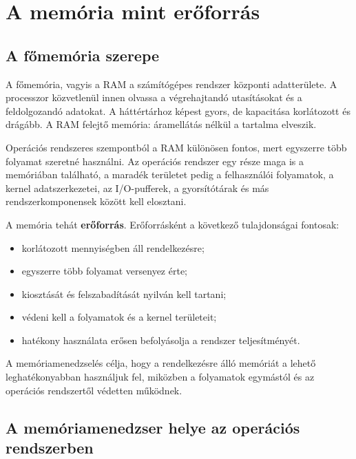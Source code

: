 \begin{center}

\end{center}

\section{A memória mint erőforrás}

\subsection{A főmemória szerepe}

A főmemória, vagyis a RAM a számítógépes rendszer központi adatterülete. A processzor közvetlenül innen olvassa a végrehajtandó utasításokat és a feldolgozandó adatokat. A háttértárhoz képest gyors, de kapacitása korlátozott és drágább. A RAM felejtő memória: áramellátás nélkül a tartalma elveszik.

Operációs rendszeres szempontból a RAM különösen fontos, mert egyszerre több folyamat szeretné használni. Az operációs rendszer egy része maga is a memóriában található, a maradék területet pedig a felhasználói folyamatok, a kernel adatszerkezetei, az I/O-pufferek, a gyorsítótárak és más rendszerkomponensek között kell elosztani.

A memória tehát \textbf{erőforrás}. Erőforrásként a következő tulajdonságai fontosak:

\begin{itemize}
  \item korlátozott mennyiségben áll rendelkezésre;
  \item egyszerre több folyamat versenyez érte;
  \item kiosztását és felszabadítását nyilván kell tartani;
  \item védeni kell a folyamatok és a kernel területeit;
  \item hatékony használata erősen befolyásolja a rendszer teljesítményét.
\end{itemize}

A memóriamenedzselés célja, hogy a rendelkezésre álló memóriát a lehető leghatékonyabban használjuk fel, miközben a folyamatok egymástól és az operációs rendszertől védetten működnek.

\subsection{A memóriamenedzser helye az operációs rendszerben}

